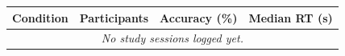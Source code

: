 \begin{tabular}{@{}lrrr@{}}
\toprule
Condition & Participants & Accuracy (\%) & Median RT (s) \\
\midrule
\multicolumn{4}{c}{\emph{No study sessions logged yet.}} \\
\bottomrule
\end{tabular}
